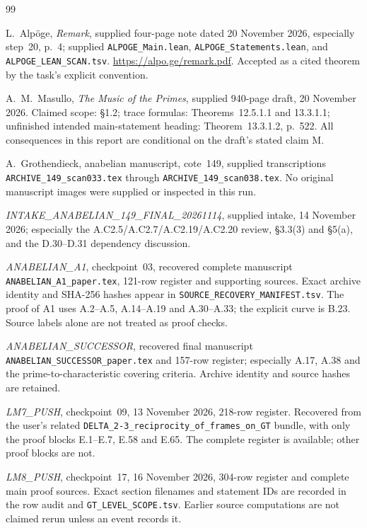 \begin{thebibliography}{99}

L.~Alp\"oge, \emph{Remark}, supplied four-page note dated 20 November
2026, especially step~20, p.~4; supplied
\texttt{ALPOGE\_Main.lean}, \texttt{ALPOGE\_Statements.lean}, and
\texttt{ALPOGE\_LEAN\_SCAN.tsv}. \url{https://alpo.ge/remark.pdf}.
Accepted as a cited theorem by the task's explicit convention.

A.~M.~Masullo, \emph{The Music of the Primes}, supplied 940-page draft,
20 November 2026. Claimed scope: \S1.2; trace formulas:
Theorems~12.5.1.1 and 13.3.1.1; unfinished intended main-statement
heading: Theorem~13.3.1.2, p.~522. All consequences in this report
are conditional on the draft's stated claim M.

A.~Grothendieck, anabelian manuscript, cote~149, supplied
transcriptions \texttt{ARCHIVE\_149\_scan033.tex} through
\texttt{ARCHIVE\_149\_scan038.tex}. No original manuscript images
were supplied or inspected in this run.

\emph{INTAKE\_ANABELIAN\_149\_FINAL\_20261114}, supplied intake,
14 November 2026; especially the A.C2.5/A.C2.7/A.C2.19/A.C2.20
review, \S3.3(3) and \S5(a), and the D.30--D.31 dependency discussion.

\emph{ANABELIAN\_A1}, checkpoint~03, recovered complete manuscript
\texttt{ANABELIAN\_A1\_paper.tex}, 121-row register and supporting
sources. Exact archive identity and SHA-256 hashes appear in
\texttt{SOURCE\_RECOVERY\_MANIFEST.tsv}. The proof of A1 uses
A.2--A.5, A.14--A.19 and A.30--A.33; the explicit curve is B.23.
Source labels alone are not treated as proof checks.

\emph{ANABELIAN\_SUCCESSOR}, recovered final manuscript
\texttt{ANABELIAN\_SUCCESSOR\_paper.tex} and 157-row register;
especially A.17, A.38 and the prime-to-characteristic covering
criteria. Archive identity and source hashes are retained.

\emph{LM7\_PUSH}, checkpoint~09, 13 November 2026, 218-row register.
Recovered from the user's related
\texttt{DELTA\_2-3\_reciprocity\_of\_frames\_on\_GT} bundle,
with only the proof blocks E.1--E.7, E.58 and E.65.
The complete register is available; other proof blocks are not.

\emph{LM8\_PUSH}, checkpoint~17, 16 November 2026,
304-row register and complete main proof sources. Exact section
filenames and statement IDs are recorded in the row audit and
\texttt{GT\_LEVEL\_SCOPE.tsv}. Earlier source computations are not
claimed rerun unless an event records it.


\end{thebibliography}
